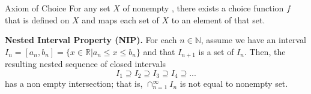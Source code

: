 \documentclass[11pt, a3paper, openany]{article}
\newcounter{Thm}[section]
\renewcommand{\theThm}{\arabic{section}.\arabic{Thm}}
\newenvironment{Thm}[1][]{
	\refstepcounter{Thm}
	\mdfsetup{
		frametitle={
			\tikz[baseline=(current bounding box.east), outer sep=0pt]
			\node[anchor=east,rectangle,fill=myblue]
			{\strut Theorem~\theThm\ifstrempty{#1}{}{:~#1}};},
		innertopmargin=10pt,linecolor=myblue,
		linewidth=2pt,topline=true,
		frametitleaboveskip=\dimexpr-\ht\strutbox\relax
	}
	\begin{mdframed}[]\relax
}{\end{mdframed}}
\theoremstyle{remark}
\theoremstyle{remark}
\theoremstyle{remark}
\newtheorem{claim}{\bfseries Claim}
\newenvironment{Proof of claim}
  {\begin{proof}[\normalfont \textbf{Proof of claim}]}
  {\end{proof}}
\theoremstyle{definition}
\theoremstyle{remark}
\theoremstyle{plain}
\begin{document}
\begin{Axiom}{Axiom of Choice}{}
    For any set $X$ of nonempty , there exists a choice function $f$ that is defined on $X$ and maps each set of $X$ to an element of that set.
\end{Axiom}
\begin{theorem}{}{}
\textbf{Nested Interval Property (NIP).} For each $n\in \mathbb{N}$, assume we have an interval $I_{n}=[a_{n}, b_{n}]=\{x \in \mathbb{R}|a_{n} \leq x \leq b_{n}\}$ and that $I_{n+1}$ is a set of $I_{n}$. Then, the resulting nested sequence of closed intervals
\begin{equation*}
    I_1 \supseteq I_2 \supseteq I_3 \supseteq I_4 \supseteq ...
\end{equation*}
has a non empty intersection; that is, $\cap_{n=1}^{\infty} I_{n}$ is not equal to nonempty set.

\end{theorem}
\end{document}
